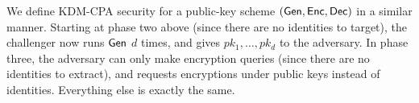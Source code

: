 We define KDM-CPA security for a public-key scheme
$(\mathsf{Gen}, \mathsf{Enc}, \mathsf{Dec})$ in a similar manner. Starting at phase
two above (since there are no identities to target), the challenger
now runs $\mathsf{Gen}$ $d$ times, and gives $pk_1, \ldots, pk_d$ to the
adversary. In phase three, the adversary can only make encryption
queries (since there are no identities to extract), and requests
encryptions under public keys instead of identities. Everything else
is exactly the same.






